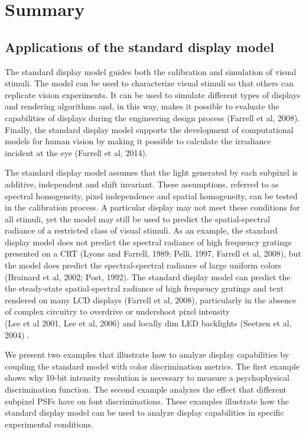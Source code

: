 \documentclass[
  letterpaper,
]{book}
\begin{document}
\section{Summary}\label{summary}

\subsection{Applications of the standard display
model}\label{applications-of-the-standard-display-model}

The standard display model guides both the calibration and simulation of
visual stimuli. The model can be used to characterize visual stimuli so
that others can replicate vision experiments. It can be used to simulate
different types of displays and rendering algorithms and, in this way,
makes it possible to evaluate the capabilities of displays during the
engineering design process (Farrell et al, 2008). Finally, the standard
display model supports the development of computational models for human
vision by making it possible to calculate the irradiance incident at the
eye (Farrell et al, 2014).

The standard display model assumes that the light generated by each
subpixel is additive, independent and shift invariant. These
assumptions, referred to as spectral homogeneity, pixel independence and
spatial homogeneity, can be tested in the calibration process. A
particular display may not meet these conditions for all stimuli, yet
the model may still be used to predict the spatial-spectral radiance of
a restricted class of visual stimuli. As an example, the standard
display model does not predict the spectral radiance of high frequency
gratings presented on a CRT (Lyons and Farrell, 1989; Pelli, 1997,
Farrell et al, 2008), but the model does predict the spectral-spectral
radiance of large uniform colors (Brainard et al, 2002; Post, 1992). The
standard display model can predict the the steady-state spatial-spectral
radiance of high frequency gratings and text rendered on many LCD
displays (Farrell et al, 2008), particularly in the absence of complex
circuitry to overdrive or undershoot pixel intensity\\
(Lee et al 2001, Lee et al, 2006) and locally dim LED backlights
(Seetzen et al, 2004) .

We present two examples that illustrate how to analyze display
capabilities by coupling the standard model with color discrimination
metrics. The first example shows why 10-bit intensity resolution is
necessary to measure a psychophysical discrimination function. The
second example analyzes the effect that different subpixel PSFs have on
font discriminations. These examples illustrate how the standard display
model can be used to analyze display capabilities in specific
experimental conditions.
\end{document}
